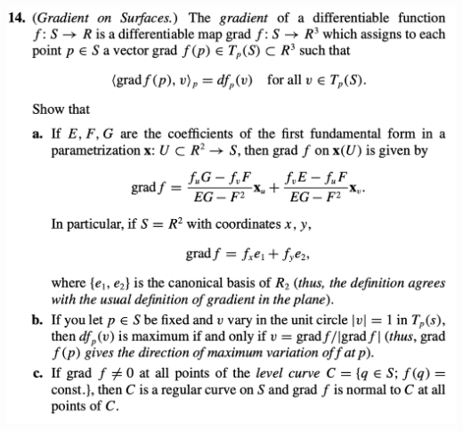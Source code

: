 \documentclass{report}
\begin{document}
\begin{question}{}{}
\includegraphics[height=18cm,width=18cm]{hw4q13}
\end{question}
\end{document}
